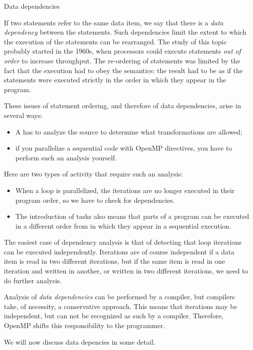  {Data dependencies}

If two statements refer to the same data item,
we say that there is a \emph{data dependency} between
the statements. Such dependencies limit the extent to which
the execution of the statements can be  rearranged.
The study of this topic probably started in the 1960s,
when processors could execute statements \emph{out of order}
to increase throughput. The re-ordering of statements
was limited by the fact that the execution
had to obey the  semantics:
the result had to be as if the statements were executed
strictly in the order in which they appear in the program.

These issues of statement ordering, and therefore of
data dependencies, arise in several ways:
\begin{itemize}
\item A  has to analyze the
  source to determine what transformations are allowed;
\item if you parallelize a sequential code with OpenMP directives, you
  have to perform such an analysis yourself.
\end{itemize}
Here are two types of activity that require such an analysis:
\begin{itemize}
\item When a loop is parallelized, the iterations are no longer
  executed in their program order, so we have to check for dependencies.
\item The introduction of tasks also means that parts of a program
  can be executed in a different order from in which they appear
  in a sequential execution.
\end{itemize}

The easiest case of dependency analysis is that of
detecting that loop iterations can be executed independently.
Iterations are of course independent if a data item
is read in two different iterations, but if the same
item is read in one iteration and written in another,
or written in two different iterations,
we need to do further analysis.

Analysis of \emph{data dependencies} can be performed
by a compiler, but compilers take, of necessity,
a conservative approach. This means that iterations
may be independent, but can not be recognized as such by
a compiler. Therefore, OpenMP shifts this responsibility
to the programmer.

We will now discuss data depencies in some detail.

